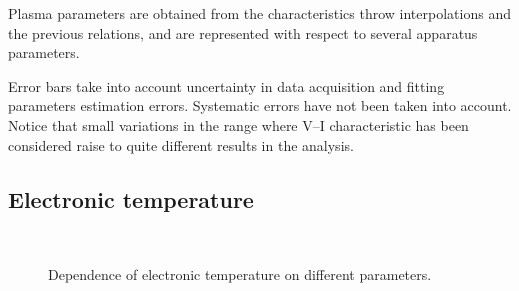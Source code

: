 \documentclass[11pt,a4 paper]{article}
\begin{document}
Plasma parameters are obtained from the characteristics throw interpolations and the previous relations, and are represented with respect to several apparatus parameters.

Error bars take into account uncertainty in data acquisition and fitting parameters estimation errors. Systematic errors have not been taken into account. Notice that small variations in the  range where V--I characteristic has been considered raise to quite different results in the analysis.

\subsection{Electronic temperature}

\begin{figure}[H]
\\%
 \caption{Dependence of electronic temperature on different parameters.}\label{fig:Te}%
\end{figure}%
\end{document}
